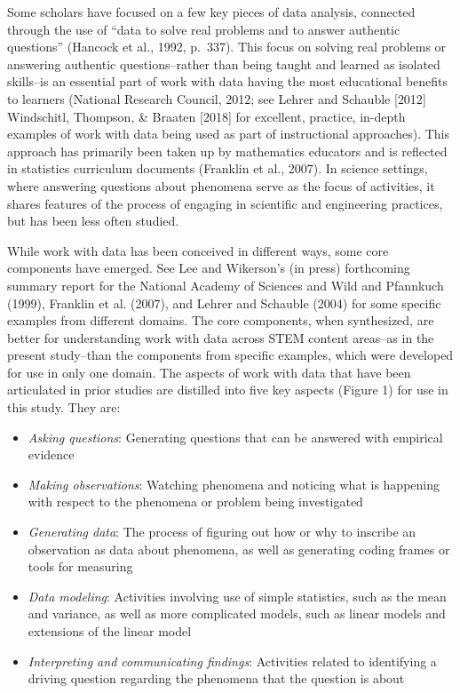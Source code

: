 \documentclass[]{msu-thesis}
\providecommand{\tightlist}{%
  \setlength{\itemsep}{0pt}\setlength{\parskip}{0pt}}
\theoremstyle{definition}
\theoremstyle{definition}
\theoremstyle{definition}
\theoremstyle{remark}
\begin{document}
Some scholars have focused on a few key pieces of data analysis,
connected through the use of ``data to solve real problems and to answer
authentic questions'' (Hancock et al., 1992, p.~337). This focus on
solving real problems or answering authentic questions--rather than
being taught and learned as isolated skills--is an essential part of
work with data having the most educational benefits to learners
(National Research Council, 2012; see Lehrer and Schauble {[}2012{]}
Windschitl, Thompson, \& Braaten {[}2018{]} for excellent, practice,
in-depth examples of work with data being used as part of instructional
approaches). This approach has primarily been taken up by mathematics
educators and is reflected in statistics curriculum documents (Franklin
et al., 2007). In science settings, where answering questions about
phenomena serve as the focus of activities, it shares features of the
process of engaging in scientific and engineering practices, but has
been less often studied.

While work with data has been conceived in different ways, some core
components have emerged. See Lee and Wikerson's (in press) forthcoming
summary report for the National Academy of Sciences and Wild and
Pfannkuch (1999), Franklin et al. (2007), and Lehrer and Schauble (2004)
for some specific examples from different domains. The core components,
when synthesized, are better for understanding work with data across
STEM content areas--as in the present study--than the components from
specific examples, which were developed for use in only one domain. The
aspects of work with data that have been articulated in prior studies
are distilled into five key aspects (Figure 1) for use in this study.
They are:

\begin{itemize}
\tightlist
\item
  \emph{Asking questions}: Generating questions that can be answered
  with empirical evidence
\item
  \emph{Making observations}: Watching phenomena and noticing what is
  happening with respect to the phenomena or problem being investigated
\item
  \emph{Generating data}: The process of figuring out how or why to
  inscribe an observation as data about phenomena, as well as generating
  coding frames or tools for measuring
\item
  \emph{Data modeling}: Activities involving use of simple statistics,
  such as the mean and variance, as well as more complicated models,
  such as linear models and extensions of the linear model
\item
  \emph{Interpreting and communicating findings}: Activities related to
  identifying a driving question regarding the phenomena that the
  question is about
\end{itemize}
\end{document}
